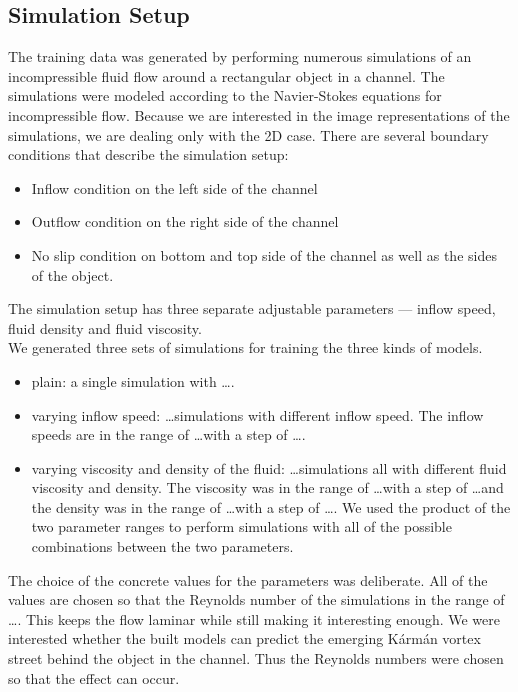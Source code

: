 \documentclass{llncs}
\begin{document}
\subsection{Simulation Setup}
The training data was generated by performing numerous simulations of an incompressible fluid flow around a rectangular object in a channel. The simulations were modeled according to the Navier-Stokes equations for incompressible flow. Because we are interested in the image representations of the simulations, we are dealing only with the 2D case. There are several boundary conditions that describe the simulation setup:
\begin{itemize}
\item Inflow condition on the left side of the channel
\item Outflow condition on the right side of the channel
\item No slip condition on bottom and top side of the channel as well as the sides of the object.
\end{itemize}
The simulation setup has three separate adjustable parameters --- inflow speed, fluid density and fluid viscosity.
\\
We generated three sets of simulations for training the three kinds of models.
\begin{itemize}
\item plain: a single simulation with \ldots.
\item varying inflow speed: \ldots simulations with different inflow speed. The inflow speeds are in the range of \ldots with a step of \ldots.
\item varying viscosity and density of the fluid: \ldots simulations all with different fluid viscosity and density. The viscosity was in the range of \ldots with a step of \ldots and the density was in the range of \ldots with a step of \ldots. We used the product of the two parameter ranges to perform simulations with all of the possible combinations between the two parameters.
\end{itemize}

The choice of the concrete values for the parameters was deliberate. All of the values are chosen so that the Reynolds number of the simulations in the range of \ldots. This keeps the flow laminar while still making it interesting enough. We were interested whether the built models can predict the emerging Kármán vortex street behind the object in the channel. Thus the Reynolds numbers were chosen so that the effect can occur.
\end{document}
